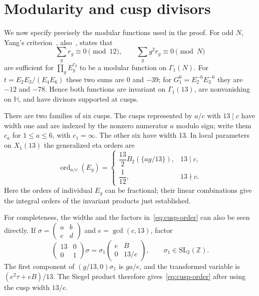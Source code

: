 \documentclass[11pt]{amsart}
\theoremstyle{remark}
\DeclareMathOperator{\ord}{ord}
\newcommand{\HH}{\mathbb H}
\newcommand{\ZZ}{\mathbb Z}
\begin{document}
\section{Modularity and cusp divisors}
We now specify precisely the modular functions used in the proof. For odd $N$, Yang's criterion~\cite[Proposition 2]{Yang09}, also~\cite[Corollary 3]{Yang04}, states that
\begin{equation}\label{eq:yang}
 \sum_g r_g\equiv0\pmod{12},\qquad
 \sum_g g^2r_g\equiv0\pmod N
\end{equation}
are sufficient for $\prod_g E_g^{r_g}$ to be a modular function on $\Gamma_1(N)$.
For $t=E_2E_3/(E_4E_6)$ these two sums are $0$ and $-39$; for
$G_1^6=E_2^{-6}E_3^{-6}$ they are $-12$ and $-78$. Hence both functions are invariant on $\Gamma_1(13)$, are nonvanishing on $\HH$, and have divisors supported at cusps.

There are two families of six cusps. The cusps represented by $a/c$ with $13\mid c$ have width one and are indexed by the nonzero numerator $a$ modulo sign; write them $c_a$ for $1\le a\le6$, with $c_1=\infty$. The other six have width 13. In local parameters on $X_1(13)$ the generalized eta orders are~\cite[Proposition 3]{Yang09}
\begin{equation}\label{eq:cusp-order}
 \ord_{a/c}(E_g)=
 \begin{cases}
 \dfrac{13}{2}B_2(\{ag/13\}),&13\mid c,\\[2pt]
 \dfrac1{12},&13\nmid c.
 \end{cases}
\end{equation}
Here the orders of individual $E_g$ can be fractional; their linear combinations give the integral orders of the invariant products just established.

For completeness, the widths and the factors in~\eqref{eq:cusp-order} can also be seen directly. If
$\sigma=\left(\begin{smallmatrix}a&b\\c&d\end{smallmatrix}\right)$ and $e=\gcd(c,13)$, factor
\[
 \begin{pmatrix}13&0\\0&1\end{pmatrix}\sigma
 =\sigma_1\begin{pmatrix}e&B\\0&13/e\end{pmatrix},\qquad \sigma_1\in\mathrm{SL}_2(\ZZ).
\]
The first component of $(g/13,0)\sigma_1$ is $ga/e$, and the transformed variable is $(e^2\tau+eB)/13$. The Siegel product therefore gives~\eqref{eq:cusp-order} after using the cusp width $13/e$.
\end{document}
